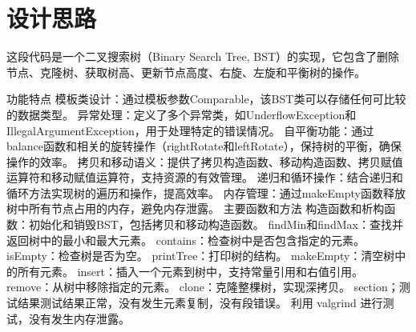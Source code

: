 \documentclass[UTF8]{ctexart}
\begin{document}
\pagestyle{fancy}
\fancyhead{}
\section{设计思路}
这段代码是一个二叉搜索树（Binary Search Tree, BST）的实现，它包含了删除节点、克隆树、获取树高、更新节点高度、右旋、左旋和平衡树的操作。

功能特点
模板类设计：通过模板参数Comparable，该BST类可以存储任何可比较的数据类型。
异常处理：定义了多个异常类，如UnderflowException和IllegalArgumentException，用于处理特定的错误情况。
自平衡功能：通过balance函数和相关的旋转操作（rightRotate和leftRotate），保持树的平衡，确保操作的效率。
拷贝和移动语义：提供了拷贝构造函数、移动构造函数、拷贝赋值运算符和移动赋值运算符，支持资源的有效管理。
递归和循环操作：结合递归和循环方法实现树的遍历和操作，提高效率。
内存管理：通过makeEmpty函数释放树中所有节点占用的内存，避免内存泄露。
主要函数和方法
构造函数和析构函数：初始化和销毁BST，包括拷贝和移动构造函数。
findMin和findMax：查找并返回树中的最小和最大元素。
contains：检查树中是否包含指定的元素。
isEmpty：检查树是否为空。
printTree：打印树的结构。
makeEmpty：清空树中的所有元素。
insert：插入一个元素到树中，支持常量引用和右值引用。
remove：从树中移除指定的元素。
clone：克隆整棵树，实现深拷贝。
section；测试结果测试结果正常，没有发生元素复制，没有段错误。
利用 valgrind 进行测试，没有发生内存泄露。
\end{document}
